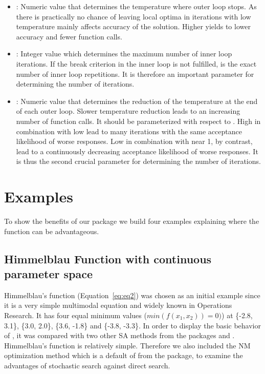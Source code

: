 \begin{itemize}
\item {}: Numeric value that determines the temperature where outer loop stops. As there is practically no chance of leaving local optima in iterations with low temperature  mainly affects accuracy of the solution. Higher  yields to lower accuracy and fewer function calls.
\item {}: Integer value which determines the maximum number of inner loop iterations. If  the break criterion in the inner loop is not fulfilled,  is the exact number of inner loop repetitions. It is therefore an important parameter for determining the number of iterations.
\item {}: Numeric value that determines the reduction of the temperature at the end of each outer loop. Slower temperature reduction leads to an increasing number of function calls. It should be parameterized with respect to . High  in combination with low  lead to many iterations with the same acceptance likelihood of worse responses. Low  in combination with  near 1, by contrast, lead to a continuously decreasing acceptance likelihood of worse responses. It is thus the second crucial parameter for determining the number of iterations.
\end{itemize}

\section{Examples}
To show the benefits of our  package we build four examples explaining where the  function can be advantageous.

\subsection{Himmelblau Function with continuous parameter space}
Himmelblau’s function (Equation~\eqref{eq:eq2}) \citep{himmelblau_1972} was chosen as an initial example since it is a very simple multimodal equation and widely known in Operations Research. It has four equal minimum values ($min(f(x_1,x_2))=0)$) at \{-2.8, 3.1\}, \{3.0, 2.0\}, \{3.6, -1.8\} and \{-3.8, -3.3\}. In order to display the basic behavior of , it was compared with two other SA methods from the packages  and . Himmelblau’s function is relatively simple. Therefore we also included the NM optimization method \citep{nelder_1965} which is a default of  from the  package, to examine the advantages of stochastic search against direct search.

